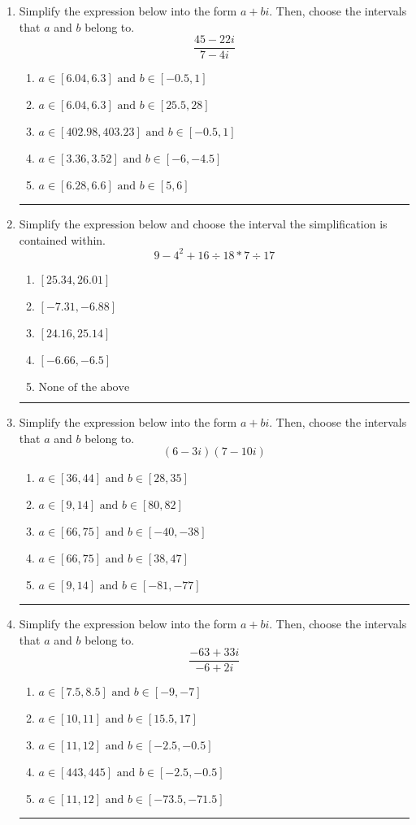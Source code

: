 \documentclass[14pt]{extbook}
\newcommand{\litem}[1]{\item#1\hspace*{-1cm}\rule{\textwidth}{0.4pt}}
\begin{document}
\begin{enumerate}
{\begin{enumerate}[label=\Alph*.]
\end{enumerate} }
\litem{
Simplify the expression below into the form $a+bi$. Then, choose the intervals that $a$ and $b$ belong to.\[ \frac{45 - 22 i}{7 - 4 i} \]\begin{enumerate}[label=\Alph*.]
\item \( a \in [6.04, 6.3] \text{ and } b \in [-0.5, 1] \)
\item \( a \in [6.04, 6.3] \text{ and } b \in [25.5, 28] \)
\item \( a \in [402.98, 403.23] \text{ and } b \in [-0.5, 1] \)
\item \( a \in [3.36, 3.52] \text{ and } b \in [-6, -4.5] \)
\item \( a \in [6.28, 6.6] \text{ and } b \in [5, 6] \)

\end{enumerate} }
\litem{
Simplify the expression below and choose the interval the simplification is contained within.\[ 9 - 4^2 + 16 \div 18 * 7 \div 17 \]\begin{enumerate}[label=\Alph*.]
\item \( [25.34, 26.01] \)
\item \( [-7.31, -6.88] \)
\item \( [24.16, 25.14] \)
\item \( [-6.66, -6.5] \)
\item \( \text{None of the above} \)

\end{enumerate} }
\litem{
Simplify the expression below into the form $a+bi$. Then, choose the intervals that $a$ and $b$ belong to.\[ (6 - 3 i)(7 - 10 i) \]\begin{enumerate}[label=\Alph*.]
\item \( a \in [36, 44] \text{ and } b \in [28, 35] \)
\item \( a \in [9, 14] \text{ and } b \in [80, 82] \)
\item \( a \in [66, 75] \text{ and } b \in [-40, -38] \)
\item \( a \in [66, 75] \text{ and } b \in [38, 47] \)
\item \( a \in [9, 14] \text{ and } b \in [-81, -77] \)

\end{enumerate} }
\litem{
Simplify the expression below into the form $a+bi$. Then, choose the intervals that $a$ and $b$ belong to.\[ \frac{-63 + 33 i}{-6 + 2 i} \]\begin{enumerate}[label=\Alph*.]
\item \( a \in [7.5, 8.5] \text{ and } b \in [-9, -7] \)
\item \( a \in [10, 11] \text{ and } b \in [15.5, 17] \)
\item \( a \in [11, 12] \text{ and } b \in [-2.5, -0.5] \)
\item \( a \in [443, 445] \text{ and } b \in [-2.5, -0.5] \)
\item \( a \in [11, 12] \text{ and } b \in [-73.5, -71.5] \)


\end{enumerate}}
\end{enumerate}
\end{document}
